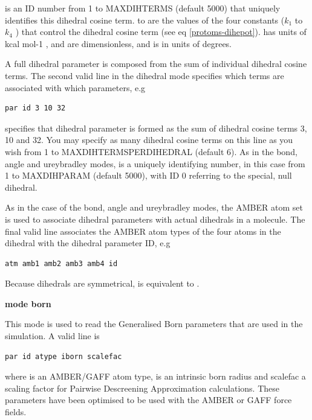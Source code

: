 \documentclass[letterpaper,10pt,english]{sphinxmanual}
\begin{document}
 is an ID number from 1 to MAXDIHTERMS (default 5000) that uniquely identifies this dihedral cosine term.  to  are the values of the four constants (\(k_1\) to \(k_4\) ) that control the dihedral cosine term (see eq \eqref{protoms-dihepot}).  has units of kcal mol-1 ,  and  are dimensionless, and  is in units of degrees.

A full dihedral parameter is composed from the sum of individual dihedral cosine terms. The second valid line in the dihedral mode specifies which terms are associated with which parameters, e.g

\begin{Verbatim}[commandchars=\\\{\}]
par id 3 10 32
\end{Verbatim}

specifies that dihedral parameter  is formed as the sum of dihedral cosine terms 3, 10 and 32. You may specify as many dihedral cosine terms on this line as you wish from 1 to MAXDIHTERMSPERDIHEDRAL (default 6). As in the bond, angle and ureybradley modes,  is a uniquely identifying number, in this case from 1 to MAXDIHPARAM (default 5000), with ID 0 referring to the special, null dihedral.

As in the case of the bond, angle and ureybradley modes, the AMBER atom set is used to associate dihedral parameters with actual dihedrals in a molecule. The final valid line associates the AMBER atom types of the four  atoms in the dihedral with the dihedral parameter ID, e.g

\begin{Verbatim}[commandchars=\\\{\}]
atm amb1 amb2 amb3 amb4 id
\end{Verbatim}

Because dihedrals are symmetrical,  is equivalent to .

\textbf{mode born}

This mode is used to read the Generalised Born parameters that are used in the simulation. A valid line is

\begin{Verbatim}[commandchars=\\\{\}]
par id atype iborn scalefac
\end{Verbatim}

where  is an AMBER/GAFF atom type,  is an intrinsic born radius and scalefac a scaling factor for Pairwise Descreening Approximation calculations. These parameters have been optimised to be used with the AMBER or GAFF force fields.
\end{document}
